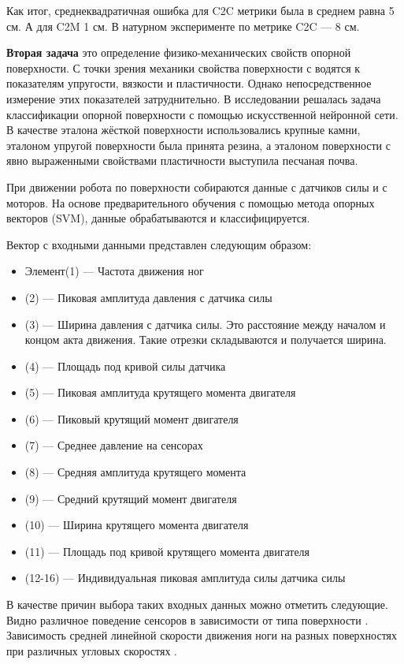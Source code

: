 Как итог, среднеквадратичная ошибка для C2C метрики была в среднем равна 5 см. А для C2M 1 см. В натурном эксперименте по метрике C2C --- 8 см.

\textbf{Вторая задача} это определение физико-механических свойств опорной поверхности. С точки зрения механики свойства поверхности с водятся к показателям упругости, вязкости и пластичности. Однако непосредственное измерение этих показателей затруднительно. В исследовании решалась задача классификации опорной поверхности с помощью искусственной нейронной сети. В качестве эталона жёсткой поверхности использовались крупные камни, эталоном упругой поверхности была принята резина, а эталоном поверхности с явно выраженными свойствами пластичности выступила песчаная почва. 

При движении робота по поверхности собираются данные с датчиков силы и с моторов. На основе предварительного обучения с помощью метода опорных векторов (SVM), данные обрабатываются и классифицируется.

Вектор с входными данными представлен следующим образом:
\begin{itemize}
    \item Элемент(1) --- Частота движения ног
    \item (2) --- Пиковая амплитуда давления с датчика силы
    \item (3) --- Ширина давления с датчика силы. Это расстояние между началом и концом акта движения. Такие отрезки складываются и получается ширина.
    \item (4) --- Площадь под кривой силы датчика
    \item (5) --- Пиковая амплитуда крутящего момента двигателя
    \item (6) --- Пиковый крутящий момент двигателя
    \item (7) --- Среднее давление на сенсорах
    \item (8) --- Средняя амплитуда крутящего момента
    \item (9) --- Средний крутящий момент двигателя
    \item (10) --- Ширина крутящего момента двигателя
    \item (11) --- Площадь под кривой крутящего момента двигателя
    \item (12-16) --- Индивидуальная пиковая амплитуда силы датчика силы 
\end{itemize}

В качестве причин выбора таких входных данных можно отметить следующие. Видно различное поведение сенсоров в зависимости от типа поверхности . Зависимость средней линейной скорости движения ноги на разных поверхностях при различных угловых скоростях . 


